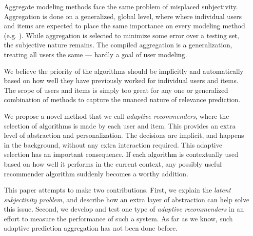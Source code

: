 Aggregate modeling methods face the same problem of misplaced subjectivity. 
Aggregation is done on a generalized, global level,
where where individual users and items are expected to place the same importance on every modeling method
(e.g. \cite{Aslam2001, Claypool1999, Bell2007, Carmel2009, Bender2005}).
While aggregation is selected to minimize some error over a testing set,
the subjective nature remains. The compiled aggregation is a generalization,
treating all users the same --- hardly a goal of user modeling.

We believe the priority of the algorithms should be implicitly and automatically
based on how well they have previously worked for individual users and items.
The scope of users and items is simply too great for any one or generalized combination
of methods to capture the nuanced nature of relevance prediction.

We propose a novel method that we call \emph{adaptive recommenders}, where 
the selection of algorithms is made by each user and item.
This provides an extra level of abstraction and personalization.
The decisions are implicit, and happens in the background, without any extra interaction required.
This adaptive selection has an important consequence. 
If each algorithm is contextually used based on how well it performs in the current context,
any possibly useful recommender algorithm suddenly becomes a worthy addition.

This paper attempts to make two contributions.
First, we explain the \emph{latent subjectivity problem},
and describe how an extra layer of abstraction can help solve this issue.
Second, we develop and test one type of \emph{adaptive recommenders}
in an effort to measure the performance of such a system.
As far as we know, such adaptive prediction aggregation has not been done before.

